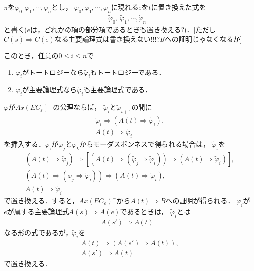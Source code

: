 	$\pi$を$\varphi_{0},\varphi_{1},\cdots,\varphi_{n}$とし，
	$\varphi_{0},\varphi_{1},\cdots,\varphi_{n}$に現れる$e$を$t$に置き換えた式を
	\begin{align}
		\tilde{\varphi}_{0},\ \tilde{\varphi}_{1},\cdots, \tilde{\varphi}_{n}
	\end{align}
	と書く($e$は，どれかの項の部分項であるときも置き換える?)．[ただし
	$C(s) \Longrightarrow C(e)$なる主要論理式は書き換えない!!!?$B$への証明じゃなくなるか]
	
	このとき，任意の$0 \leq i \leq n$で
	\begin{enumerate}
		\item $\varphi_{i}$がトートロジーなら$\tilde{\varphi}_{i}$もトートロジーである．
		\item $\varphi_{i}$が主要論理式なら$\tilde{\varphi}_{i}$も主要論理式である．
	\end{enumerate}
	
	$\varphi$が$Ax(EC_{\varepsilon})^{-}$の公理ならば，
	$\tilde{\varphi}_{i}$と$\tilde{\varphi}_{i+1}$の間に
	\begin{align}
		&\tilde{\varphi}_{i} \Longrightarrow 
		\left( A(t) \Longrightarrow \tilde{\varphi}_{i} \right), \\
		&A(t) \Longrightarrow \tilde{\varphi}_{i}
	\end{align}
	を挿入する．$\varphi_{i}$が$\varphi_{j}$と$\varphi_{k}$からモーダスポンネスで得られる場合は，
	$\tilde{\varphi}_{i}$を
	\begin{align}
		&\left( A(t) \Longrightarrow \tilde{\varphi}_{j} \right)
		\Longrightarrow \left[ \left( A(t) \Longrightarrow 
		\left( \tilde{\varphi}_{j}\Longrightarrow \tilde{\varphi}_{i} \right) \right)
		\Longrightarrow \left( A(t) \Longrightarrow \tilde{\varphi}_{i} \right) \right], \\
		&\left( A(t) \Longrightarrow 
		\left( \tilde{\varphi}_{j}\Longrightarrow \tilde{\varphi}_{i} \right) \right)
		\Longrightarrow \left( A(t) \Longrightarrow \tilde{\varphi}_{i} \right), \\
		&A(t) \Longrightarrow \tilde{\varphi}_{i}
	\end{align}
	で置き換える．すると，$Ax(EC_{\varepsilon})^{-}$から$A(t) \Longrightarrow B$への証明が得られる．
	$\varphi_{i}$が$e$が属する主要論理式$A(s) \Longrightarrow A(e)$であるときは，
	$\tilde{\varphi}_{i}$とは
	\begin{align}
		A(s') \Longrightarrow A(t)
	\end{align}
	なる形の式であるが，$\tilde{\varphi}_{i}$を
	\begin{align}
		&A(t) \Longrightarrow (A(s') \Longrightarrow A(t)), \\
		&A(s') \Longrightarrow A(t)
	\end{align}
	で置き換える．
	
